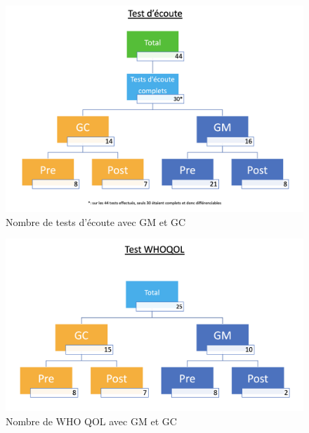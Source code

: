 \begin{figure}
	\centering
	\includegraphics[width=1\linewidth]{images/graphiques/Testecoute.png}
	\caption{Nombre de tests d'écoute avec GM et GC}
	
\end{figure}



\begin{figure}
	\centering
	\includegraphics[width=1\linewidth]{images/graphiques/TestWQ.png}
	\caption{Nombre de WHO QOL avec GM et GC}
\end{figure}





